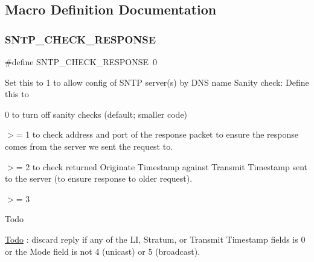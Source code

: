 \subsection{Macro Definition Documentation}
\mbox{\label{group__sntp__opts_ga7d4e12d90912d486e64f289d7f3ca446}} 
\subsubsection{\texorpdfstring{S\+N\+T\+P\+\_\+\+C\+H\+E\+C\+K\+\_\+\+R\+E\+S\+P\+O\+N\+SE}{SNTP\_CHECK\_RESPONSE}\hspace{0.1cm}{\footnotesize\ttfamily [1/2]}}
{\footnotesize\ttfamily \#define S\+N\+T\+P\+\_\+\+C\+H\+E\+C\+K\+\_\+\+R\+E\+S\+P\+O\+N\+SE~0}

Set this to 1 to allow config of S\+N\+TP server(s) by D\+NS name Sanity check\+: Define this to
\begin{DoxyItemize}
\item 0 to turn off sanity checks (default; smaller code)
\item $>$= 1 to check address and port of the response packet to ensure the response comes from the server we sent the request to.
\item $>$= 2 to check returned Originate Timestamp against Transmit Timestamp sent to the server (to ensure response to older request).
\item $>$= 3\begin{DoxyRefDesc}{Todo}
\item[\hyperlink{todo__todo000010}{Todo}]\+: discard reply if any of the LI, Stratum, or Transmit Timestamp fields is 0 or the Mode field is not 4 (unicast) or 5 (broadcast).\end{DoxyRefDesc}

\end{DoxyItemize}\mbox{\label{group__sntp__opts_ga7d4e12d90912d486e64f289d7f3ca446}} 
